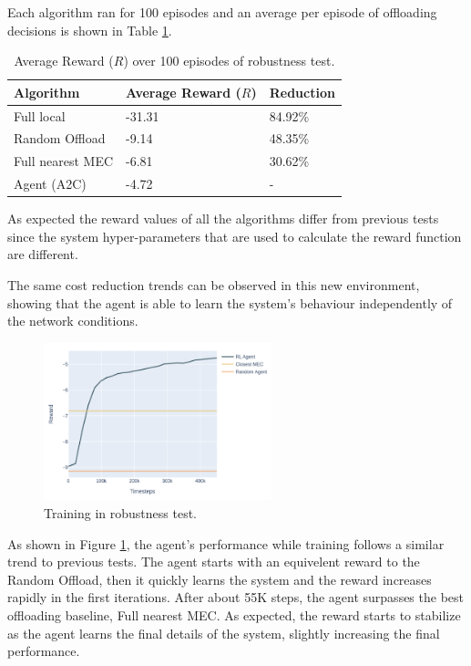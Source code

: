 Each algorithm ran for 100 episodes and an average per episode of offloading decisions is shown in Table \ref{robust_table}.

\begin{table}[H]
\centering
\begin{tabular}{|l|l|l|}
\hline
Algorithm        & Average Reward ($R$) & Reduction\\ \hline
Full local       & -31.31 & 84.92\%\\
Random Offload   & -9.14 & 48.35\%\\
Full nearest MEC & -6.81 & 30.62\%\\ 
Agent (A2C) & -4.72 & -\\ \hline
\end{tabular}
\caption{Average Reward ($R$) over 100 episodes of robustness test.} \label{robust_table}
\end{table}

As expected the reward values of all the algorithms differ from previous tests since the system hyper-parameters that are used to calculate the reward function are different.

The same cost reduction trends can be observed in this new environment, showing that the agent is able to learn the system's behaviour independently of the network conditions.

\begin{figure}[H]
  \centering
  \includegraphics[width=250px]{images/5_10_training_new.png}
  \caption{Training in robustness test.}  \label{robust_training}
\end{figure}

As shown in Figure \ref{robust_training}, the agent's performance while training follows a similar trend to previous tests. The agent starts with an equivelent reward to the Random Offload, then it quickly learns the system and the reward increases rapidly in the first iterations. After about 55K steps, the agent surpasses the best offloading baseline, Full nearest MEC. As expected, the reward starts to stabilize as the agent learns the final details of the system, slightly increasing the final performance.

